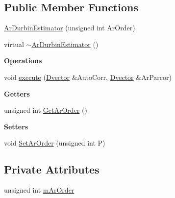 \subsection*{Public Member Functions}
\begin{DoxyCompactItemize}
\item 
\hyperlink{classtsa_1_1_ar_durbin_estimator_a2c79884f3aca03b9f6701c826dcbc07b}{Ar\+Durbin\+Estimator} (unsigned int Ar\+Order)
\item 
virtual \hyperlink{classtsa_1_1_ar_durbin_estimator_a19ed9832b8899ebf095d339952ee0f47}{$\sim$\+Ar\+Durbin\+Estimator} ()
\end{DoxyCompactItemize}
\begin{Indent}\textbf{ Operations}\par
\begin{DoxyCompactItemize}
\item 
void \hyperlink{classtsa_1_1_ar_durbin_estimator_acefc1efc5c95e7b7b2703eab6aa0bcd6}{execute} (\hyperlink{namespacetsa_a8900fb03d849baf447a1a0efe2561fb2}{Dvector} \&Auto\+Corr, \hyperlink{namespacetsa_a8900fb03d849baf447a1a0efe2561fb2}{Dvector} \&Ar\+Parcor)
\end{DoxyCompactItemize}
\end{Indent}
\begin{Indent}\textbf{ Getters}\par
\begin{DoxyCompactItemize}
\item 
unsigned int \hyperlink{classtsa_1_1_ar_durbin_estimator_adce1261baa333e3a2c0c2c502544d135}{Get\+Ar\+Order} ()
\end{DoxyCompactItemize}
\end{Indent}
\begin{Indent}\textbf{ Setters}\par
\begin{DoxyCompactItemize}
\item 
void \hyperlink{classtsa_1_1_ar_durbin_estimator_af5cfeefd7e9a7bbd564373ead8d2a308}{Set\+Ar\+Order} (unsigned int P)
\end{DoxyCompactItemize}
\end{Indent}
\subsection*{Private Attributes}
\begin{DoxyCompactItemize}
\item 
unsigned int \hyperlink{classtsa_1_1_ar_durbin_estimator_a40783c942f77e9626e48eb1f8d7771ac}{m\+Ar\+Order}
\end{DoxyCompactItemize}


